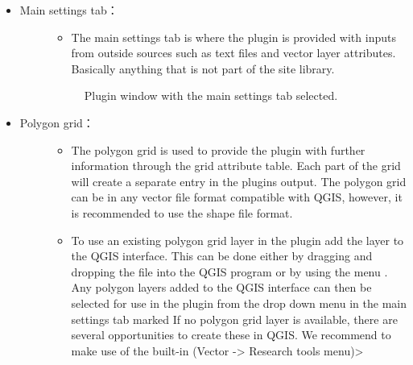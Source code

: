 \documentclass[letterpaper,10pt,english]{sphinxmanual}
\begin{document}
\begin{itemize}
\begin{description}
\begin{itemize}
\begin{description}
\begin{itemize}
\begin{description}
\begin{itemize}
\end{itemize}

\end{description}

\item {} \begin{description}
\item[{Main settings tab：}] \leavevmode\begin{itemize}
\item {} 
The main settings tab is where the plugin is provided with inputs from outside sources such as text files and vector layer attributes. Basically anything that is not part of the site library.

\end{itemize}

\begin{figure}[htbp]
\centering
\capstart

\noindent{}
\caption{Plugin window with the main settings tab selected.}\label{\detokenize{pre-processor/SUEWS Prepare:id2}}\end{figure}

\end{description}

\item {} \begin{description}
\item[{Polygon grid：}] \leavevmode\begin{itemize}
\item {} 
The polygon grid is used to provide the plugin with further information through the grid attribute table. Each part of the grid will create a separate entry in the plugins output. The polygon grid can be in any vector file format compatible with QGIS, however, it is recommended to use the shape file format.

\item {} 
To use an existing polygon grid layer in the plugin add the layer to the QGIS interface. This can be done either by dragging and dropping the file into the QGIS program or by using the menu . Any polygon layers added to the QGIS interface can then be selected for use in the plugin from the drop down menu in the main settings tab marked  If no polygon grid layer is available, there are several opportunities to create these in QGIS. We  recommend to make use of the built-in  (Vector -\textgreater{} Research tools menu)\textgreater{}


\end{itemize}
\end{description}
\end{itemize}
\end{description}
\end{itemize}
\end{description}
\end{itemize}
\end{document}
